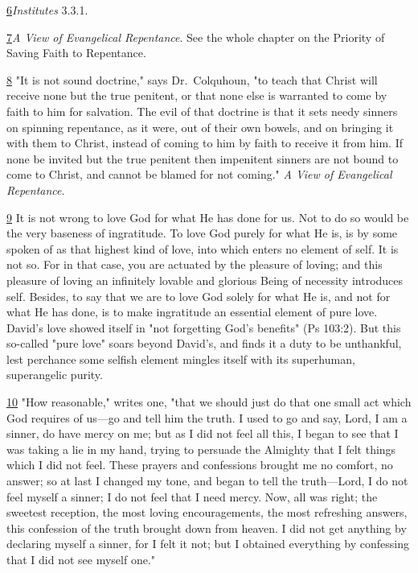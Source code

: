 \documentclass[
]{book}
\begin{document}
\protect\hyperlink{sdfootnote6anc}{6}\emph{Institutes} 3.3.1.

\protect\hyperlink{sdfootnote7anc}{7}\emph{A View of Evangelical Repentance}. See the whole chapter on the Priority of Saving Faith to Repentance.

\protect\hyperlink{sdfootnote8anc}{8} "It is not sound doctrine," says Dr.~Colquhoun, "to teach that Christ will receive none but the true penitent, or that none else is warranted to come by faith to him for salvation. The evil of that doctrine is that it sets needy sinners on spinning repentance, as it were, out of their own bowels, and on bringing it with them to Christ, instead of coming to him by faith to receive it from him. If none be invited but the true penitent then impenitent sinners are not bound to come to Christ, and cannot be blamed for not coming." \emph{A View of Evangelical Repentance}.

\protect\hyperlink{sdfootnote9anc}{9} It is not wrong to love God for what He has done for us. Not to do so would be the very baseness of ingratitude. To love God purely for what He is, is by some spoken of as that highest kind of love, into which enters no element of self. It is not so. For in that case, you are actuated by the pleasure of loving; and this pleasure of loving an infinitely lovable and glorious Being of necessity introduces self. Besides, to say that we are to love God solely for what He is, and not for what He has done, is to make ingratitude an essential element of pure love. David's love showed itself in "not forgetting God's benefits" (Ps 103:2). But this so-called "pure love" soars beyond David's, and finds it a duty to be unthankful, lest perchance some selfish element mingles itself with its superhuman, superangelic purity.

\protect\hyperlink{sdfootnote10anc}{10} "How reasonable," writes one, "that we should just do that one small act which God requires of us---go and tell him the truth. I used to go and say, Lord, I am a sinner, do have mercy on me; but as I did not feel all this, I began to see that I was taking a lie in my hand, trying to persuade the Almighty that I felt things which I did not feel. These prayers and confessions brought me no comfort, no answer; so at last I changed my tone, and began to tell the truth---Lord, I do not feel myself a sinner; I do not feel that I need mercy. Now, all was right; the sweetest reception, the most loving encouragements, the most refreshing answers, this confession of the truth brought down from heaven. I did not get anything by declaring myself a sinner, for I felt it not; but I obtained everything by confessing that I did not see myself one."
\end{document}
